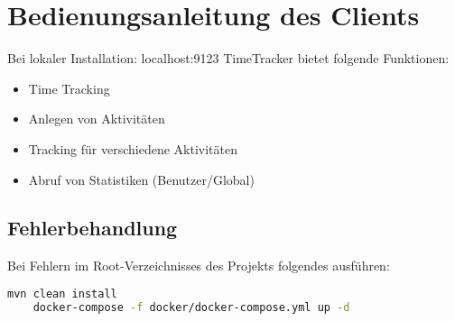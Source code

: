 
\section{Bedienungsanleitung des Clients}

Bei lokaler Installation: localhost:9123
\newline
TimeTracker bietet folgende Funktionen:
\begin{itemize}
	\item Time Tracking
	\item Anlegen von Aktivitäten %
	\item Tracking für verschiedene Aktivitäten
	\item Abruf von Statistiken (Benutzer/Global)
\end{itemize}

\subsection{Fehlerbehandlung}

Bei Fehlern im Root-Verzeichnisses des Projekts folgendes ausführen:

\begin{lstlisting}[language=bash]
	mvn clean install
	docker-compose -f docker/docker-compose.yml up -d
\end{lstlisting}